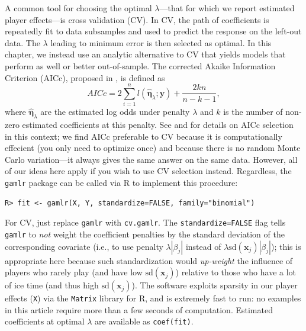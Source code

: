  A common tool for choosing the optimal $\lambda$---that for which we report
 estimated player effects---is cross validation (CV).  In CV, the path of
 coefficients is repeatedly fit to data subsamples and used to predict the
 response on the left-out data. The $\lambda$ leading to minimum error is then
 selected as optimal.  In this chapter, we instead use an analytic alternative
 to CV that yields models that perform as well or better out-of-sample.   The
 corrected Akaike Information Criterion (AICc), proposed in
 \cite{hurvich_regression_1989}, is defined as
\begin{equation*}
AICc = 2\sum_{i=1}^{n} l(\boldsymbol{\hat\eta}_{\lambda};\mathbf{y}) + \frac{2kn}{n-k-1},
\end{equation*}
where $\boldsymbol{\hat\eta}_{\lambda}$ are the estimated log odds under
penalty $\lambda$ and $k$ is the number of non-zero estimated coefficients at
this penalty. See \cite{taddy_one-step_2015} and \cite{flynn_efficiency_2013}
for details on AICc selection in this context; we find AICc preferable to CV
because it is computationally effecient (you only need to optimize once) and
because there is no random Monte Carlo variation---it always gives the same
answer on the same data.  However, all of our ideas here apply if you wish to
use CV selection instead. Regardless, the {\tt gamlr} package \cite{gamlr} can
be called via {\sf R} to implement this procedure:
\begin{verbatim}
R> fit <- gamlr(X, Y, standardize=FALSE, family="binomial")
\end{verbatim}
For CV, just replace \verb!gamlr! with \verb!cv.gamlr!. The
\verb!standardize=FALSE! flag tells \verb!gamlr! to \textit{not} weight the
coefficient penalties by the standard deviation of the corresponding covariate
(i.e., to use penalty $\lambda|\beta_j|$ instead of
$\lambda\mathrm{sd}(\mathbf{x}_j)|\beta_j|$); this is appropriate here because
such standardization would \textit{up-weight} the influence of players who
rarely play (and have low $\mathrm{sd}(\mathbf{x}_j)$) relative to those who
have a lot of ice time (and thus high $\mathrm{sd}(\mathbf{x}_j)$).  The
software exploits sparsity in our player effects (\verb!X!) via the
\verb!Matrix! library for {\sf R}, and is extremely fast to run: no examples
in this article require more than a few seconds of computation. Estimated
coefficients at optimal $\lambda$ are available as \verb!coef(fit)!.


